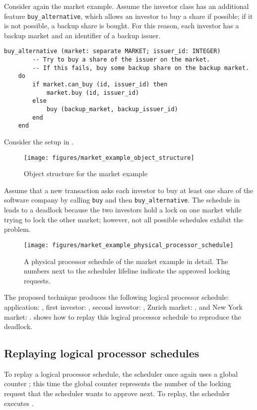 Consider again the market example. Assume the investor class has an additional feature \lstinline[language=SCOOP]!buy_alternative!, which allows an investor to buy a share if possible; if it is not possible, a backup share is bought. For this reason, each investor has a backup market and an identifier of a backup issuer.
\begin{lstlisting}[language=SCOOP]
buy_alternative (market: separate MARKET; issuer_id: INTEGER)
		-- Try to buy a share of the issuer on the market.
		-- If this fails, buy some backup share on the backup market.
	do
		if market.can_buy (id, issuer_id) then
			market.buy (id, issuer_id)
		else
			buy (backup_market, backup_issuer_id)
		end
	end
\end{lstlisting}
Consider the setup in .
\begin{figure}[ht]
  \centering
  \texttt{[image: figures/market\_example\_object\_structure]}
  \caption{Object structure for the market example}
  \label{fig:market example object structure}
\end{figure}
Assume that a new transaction asks each investor to buy at least one share of the software company by calling \lstinline[language=SCOOP]!buy! and then \lstinline[language=SCOOP]!buy_alternative!. The schedule in  leads to a deadlock because the two investors hold a lock on one market while trying to lock the other market; however, not all possible schedules exhibit the problem.
\begin{figure}[!ht]
  \centering
  \texttt{[image: figures/market\_example\_physical\_processor\_schedule]}
  \caption{A physical processor schedule of the market example in detail. The numbers next to the scheduler lifeline indicate the approved locking requests.}
  \label{fig:market example physical processor schedule}
  \vspace*{1cm}
\end{figure}
The proposed technique produces the following logical processor schedule: application: , first investor: , second investor: , Zurich market: , and New York market: .  shows how to replay this logical processor schedule to reproduce the deadlock.


\subsection{Replaying logical processor schedules}\label{sec:replaying logical processor schedules}
To replay a logical processor schedule, the scheduler once again uses a global counter ; this time the global counter represents the number of the locking request that the scheduler wants to approve next. To replay, the scheduler executes .


